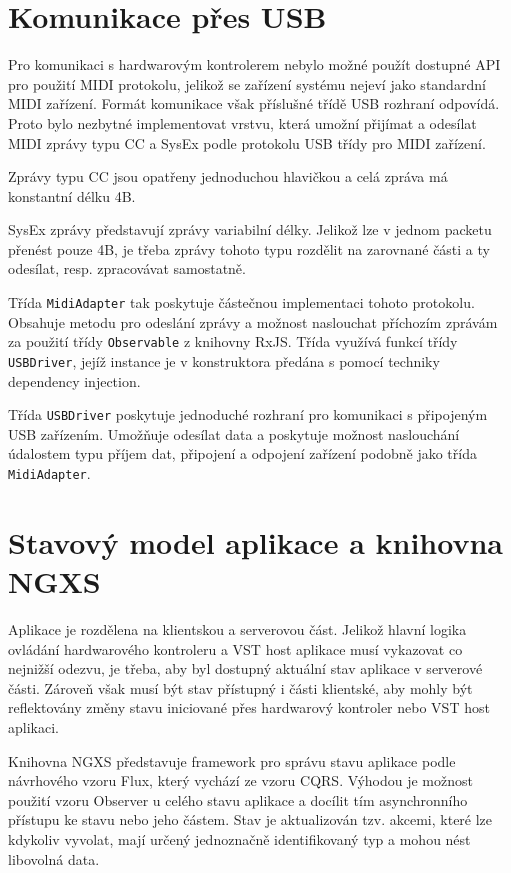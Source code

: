 \documentclass[thesis=M,czech]{FITthesis}[2019/03/06]
\begin{document}
	\section{Komunikace přes USB}
	Pro komunikaci s hardwarovým kontrolerem nebylo možné použít dostupné API pro použití MIDI protokolu,
	jelikož se zařízení systému nejeví jako standardní MIDI zařízení. Formát komunikace však příslušné třídě USB rozhraní odpovídá.
	Proto bylo nezbytné implementovat vrstvu, která umožní přijímat a odesílat MIDI zprávy typu CC a SysEx
	podle protokolu USB třídy pro MIDI zařízení\cite{usbmidi}.
	
	Zprávy typu CC jsou opatřeny jednoduchou hlavičkou a celá zpráva má konstantní délku 4B.
	
	SysEx zprávy představují zprávy variabilní délky. Jelikož lze v jednom packetu přenést pouze 4B,
	je třeba zprávy tohoto typu rozdělit na zarovnané části a ty odesílat, resp. zpracovávat samostatně.
	
	Třída \texttt{MidiAdapter} tak poskytuje částečnou implementaci tohoto protokolu. 
	Obsahuje metodu pro odeslání zprávy a možnost naslouchat příchozím zprávám za použití třídy \texttt{Observable} z knihovny RxJS.		
	Třída využívá funkcí třídy \texttt{USBDriver}, jejíž instance je v konstruktora předána s pomocí techniky dependency injection\cite{prasanna2009dependency}.
	
	Třída \texttt{USBDriver} poskytuje jednoduché rozhraní pro komunikaci s připojeným USB zařízením.
	Umožňuje odesílat data a poskytuje možnost naslouchání údalostem typu příjem dat, připojení a odpojení zařízení podobně jako třída \texttt{MidiAdapter}.
	
	\section{Stavový model aplikace a knihovna NGXS}\label{sec:NGXS}
	Aplikace je rozdělena na klientskou a serverovou část. Jelikož hlavní logika ovládání hardwarového kontroleru a VST host aplikace
	musí vykazovat co nejnižší odezvu, je třeba, aby byl dostupný aktuální stav aplikace v serverové části.
	Zároveň však musí být stav přístupný i části klientské, aby mohly být reflektovány změny stavu iniciované přes
	hardwarový kontroler nebo VST host aplikaci.
	
	Knihovna NGXS představuje framework pro správu stavu aplikace podle návrhového vzoru Flux\cite{flux}, který vychází ze vzoru CQRS\cite{flux-cqrs}. Výhodou je možnost použití vzoru Observer u celého stavu aplikace a docílit tím asynchronního
	přístupu ke stavu nebo jeho částem\cite{mansilla2018reactive}. Stav je aktualizován tzv. akcemi, které lze kdykoliv vyvolat,
	mají určený jednoznačně identifikovaný typ a mohou nést libovolná data.
	
\end{document}
